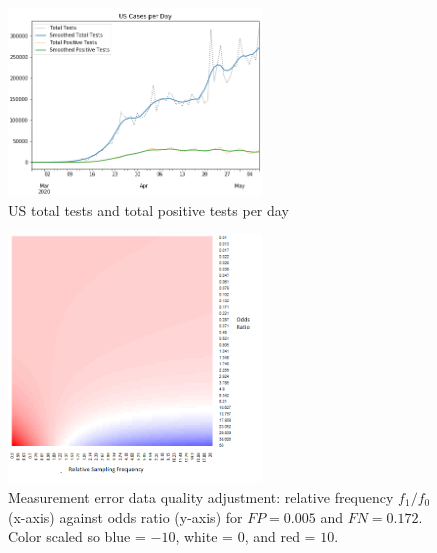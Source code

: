 \documentclass[12pt]{article}
\begin{document}
\clearpage

\begin{figure}[!th]
\centering
\includegraphics[width = 0.6\textwidth]{../methods/figs/US-casecount.png}
\caption{US total tests and total positive tests per day}
\label{fig:ustests}
\end{figure}

\begin{figure}[!th]
\centering
\includegraphics[width = 0.6\textwidth]{../methods/figs/mem_heatmap_article.png}
\caption{Measurement error data quality adjustment: relative frequency $f_1/f_0$ (x-axis) against odds ratio (y-axis) for $FP=0.005$ and $FN=0.172$. Color scaled so blue = $-10$, white = $0$, and red = $10$.}
\label{fig:heatmap}
\end{figure}
\end{document}
